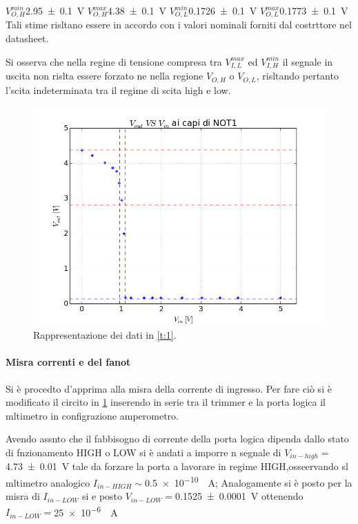 	 			$V_{O,H}^{min}$\SI{2.95 \pm 0.1}{\volt}
	 			$V_{O,H}^{max}$\SI{4.38 \pm 0.1}{\volt}
	 			$V_{O,L}^{min}$\SI{0.1726 \pm 0.1}{\volt}
	 			$V_{O,L}^{max}$\SI{0.1773 \pm 0.1}{\volt}
	 Tali stime risltano essere in accordo con i valori
	 nominali forniti dal costrttore nel datasheet.
	 
	 Si osserva che nella regine di tensione compresa tra 	$V_{I,L}^{max}$ ed $V_{I,H}^{min}$ il segnale in uscita non rislta essere forzato ne nella regione $V_{O,H}$ o $V_{O,L}$, risltando pertanto  l'scita indeterminata tra il regime di scita high e low.
	\begin{center}
		\begin{figure}[h]
			\includegraphics[scale=0.50]{../immagine/in-ot.png}
			\caption{Rappresentazione dei dati in \tablename{ \ref{t:1}}.}
			\label{f:i1}
		\end{figure}
	\end{center}
\paragraph{Misra correnti e del fanot}
	Si è procedto d'apprima alla misra della corrente di ingresso.
	Per fare ciò si è modificato il circito in \figurename{ \ref{f:i1}} inserendo in serie tra il trimmer e la porta logica il mltimetro in configrazione amperometro.
	
	Avendo assnto che il fabbisogno di corrente della porta logica dipenda 	dallo stato di fnzionamento HIGH o LOW
	si è andati a imporre n segnale di $V_{in-high}=$\SI{4.73\pm 0.01}{\volt} tale da forzare la porta a lavorare in regime HIGH,osseervando sl mltimetro analogico $I_{in-HIGH}\sim$\SI{0.5e-10}{\mu \ampere};
	Analogamente si è posto per la misra di  $I_{in-LOW}$ si e posto  $V_{in-LOW}=$\SI{0.1525\pm 0.0001}{\volt} ottenendo $I_{in-LOW}=$\SI{25e-6}{\mu \ampere}
	
